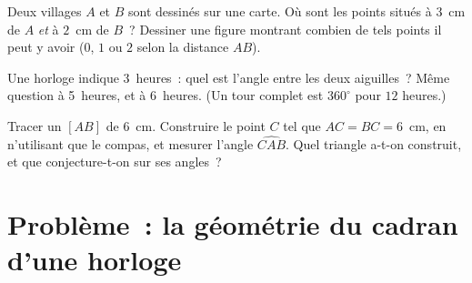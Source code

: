 \begin{exercise}[$\star\star$]\label{exo:g6:lines:10}
Deux villages $A$ et $B$ sont dessinés sur une carte. Où sont les
points situés à $3$~cm de $A$ \emph{et} à $2$~cm de $B$~? Dessiner
une figure montrant combien de tels points il peut y avoir ($0$, $1$
ou $2$ selon la distance $AB$).
\end{exercise}

\begin{exercise}[$\star\star$]\label{exo:g6:lines:11}
Une horloge indique 3~heures~: quel est l'angle entre les deux
aiguilles~? Même question à 5~heures, et à 6~heures. (Un tour complet
est $360^\circ$ pour $12$ heures.)
\end{exercise}

\begin{exercise}[$\star\star\star$]\label{exo:g6:lines:12}
Tracer un  $[AB]$ de $6$~cm. Construire le point $C$ tel que
$AC = BC = 6$~cm, en n'utilisant que le compas, et mesurer l'angle
$\widehat{CAB}$. Quel triangle a-t-on construit, et que conjecture-t-on
sur ses angles~?
\end{exercise}

\section{Problème~: la géométrie du cadran d'une horloge}

